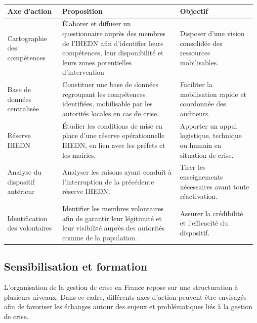 \documentclass[12pt,a4paper]{article}
\begin{document}
\renewcommand{\arraystretch}{1.3}
\begin{center}
\begin{tabular}{|C{4cm}|C{6cm}|C{4cm}|}
\hline
\textbf{Axe d'action} & \textbf{Proposition} & \textbf{Objectif} \\
\hline
Cartographie des compétences &
Élaborer et diffuser un questionnaire auprès des membres de l'IHEDN afin
d'identifier leurs compétences, leur disponibilité et leurs zones potentielles
d'intervention\footnotemark &
Disposer d'une vision consolidée des ressources mobilisables. \\
\hline
Base de données centralisée &
Constituer une base de données regroupant les compétences identifiées, mobilisable
par les autorités locales en cas de crise. &
Faciliter la mobilisation rapide et coordonnée des auditeurs. \\
\hline
Réserve IHEDN &
Étudier les conditions de mise en place d'une réserve opérationnelle IHEDN, en lien
avec les préfets et les mairies. &
Apporter un appui logistique, technique ou humain en situation de crise. \\
\hline
Analyse du dispositif antérieur &
Analyser les raisons ayant conduit à l'interruption de la précédente réserve IHEDN. &
Tirer les enseignements nécessaires avant toute réactivation. \\
\hline
Identification des volontaires &
Identifier les membres volontaires afin de garantir leur légitimité et leur
visibilité auprès des autorités comme de la population. &
Assurer la crédibilité et l'efficacité du dispositif. \\
\hline
\end{tabular}
\end{center}


\newpage

\subsection{Sensibilisation et formation}

L'organisation de la gestion de crise en France repose sur une structuration à plusieurs niveaux. Dans ce cadre, différents axes d'action peuvent être envisagés afin de favoriser les échanges autour des enjeux et problématiques liés à la gestion de crise.
\end{document}
